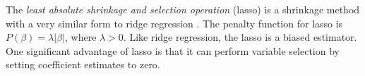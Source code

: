 \documentclass[final,onefignum,onetabnum]{siuro210301}
\begin{document}

	
	The \textit{least absolute shrinkage and selection operation} (lasso) is a shrinkage method with a very similar form to ridge regression \cite{tibshirani1996regression, james2013introduction}. The penalty function for lasso is $P(\beta) = \lambda\vert \beta \vert$, where $\lambda > 0$. Like ridge regression, the lasso is a biased estimator. One significant advantage of lasso is that it can perform variable selection by setting coefficient estimates to zero.
	

	
\end{document}
